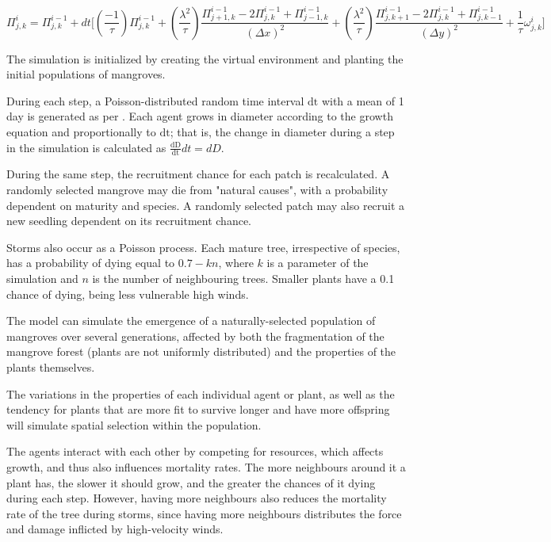 \begin{dmath}
\Pi_{j,k}^{i} = \Pi_{j,k}^{i - 1} + dt\lbrack(\frac{- 1}{\tau})\Pi_{j,k}^{i - 1} + (\frac{\lambda^{2}}{\tau})\frac{\Pi_{j + 1,k}^{i - 1} - 2\Pi_{j,k}^{i - 1} + \Pi_{j - 1,k}^{i - 1}}{{(\Delta x)}^{2}} + (\frac{\lambda^{2}}{\tau})\frac{\Pi_{j,k + 1}^{i - 1} - 2\Pi_{j,k}^{i - 1} + \Pi_{j,k - 1}^{i - 1}}{{(\Delta y)}^{2}} + \frac{1}{\tau}\omega_{j,k}^{i}\rbrack
\end{dmath}

The simulation is initialized by creating the virtual environment and planting the initial populations of mangroves.

During each step, a Poisson-distributed random time interval
\(\text{dt}\) with a mean of 1 day is generated as per \cite{SalmoJuanico2015}. Each
agent grows in diameter according to the growth equation and
proportionally to \(\text{dt}\); that is, the change in diameter during a
step in the simulation is calculated as \(\frac{\text{dD}}{\text{dt}}dt = dD\).

During the same step, the recruitment chance for each patch is
recalculated. A randomly selected mangrove may die from "natural
causes", with a probability dependent on maturity and species. A randomly
selected patch may also recruit a new seedling dependent on its
recruitment chance.

Storms also occur as a Poisson process. Each mature tree, irrespective
of species, has a probability of dying equal to \(0.7 - kn\),
where \(k\) is a parameter of the simulation and \(n\) is the number of
neighbouring trees. Smaller plants have a 0.1 chance of dying, being less vulnerable
high winds.

The model can simulate the emergence of a naturally-selected population
of mangroves over several generations, affected by both the
fragmentation of the mangrove forest (plants are not uniformly
distributed) and the properties of the plants themselves. 

The variations in the properties of each individual agent or plant, as
well as the tendency for plants that are more fit to survive longer and
have more offspring will simulate spatial selection within the
population.

The agents interact with each other by competing for resources, which
affects growth, and thus also influences mortality rates. The more
neighbours around it a plant has, the slower it should grow, and the
greater the chances of it dying during each step. However, having more
neighbours also reduces the mortality rate of the tree during storms,
since having more neighbours distributes the force and damage inflicted
by high-velocity winds.
